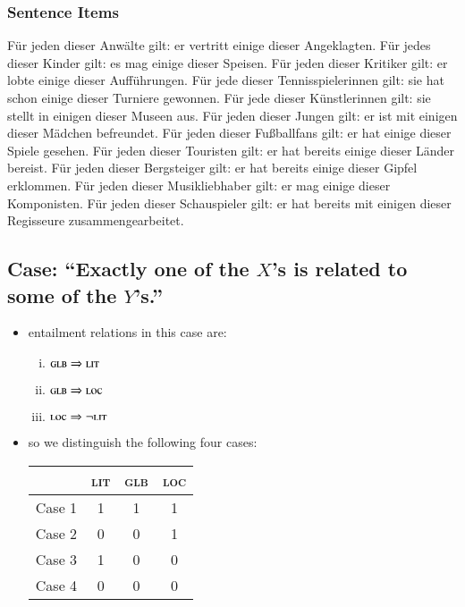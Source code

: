 \documentclass[fleqn,reqno,10pt,draft]{article}
\newcommand{\lit}{\ensuremath{\text{\textsc{lit}}}}
\newcommand{\glb}{\ensuremath{\text{\textsc{glb}}}}
\newcommand{\loc}{\ensuremath{\text{\textsc{loc}}}}
\begin{document}
\subsubsection{Sentence Items}
\label{sec:sentence-items}

\begin{exe}
  \ex
    \begin{xlist}
    \ex Für jeden dieser Anwälte gilt: er vertritt einige dieser
      Angeklagten.
    \ex Für jedes dieser Kinder gilt: es mag einige dieser
      Speisen.
    \ex Für jeden dieser Kritiker gilt: er lobte einige dieser
      Aufführungen.
    \ex Für jede dieser Tennisspielerinnen gilt: sie hat schon
      einige dieser Turniere gewonnen.
    \ex Für jede dieser Künstlerinnen gilt: sie stellt in einigen
      dieser Museen aus.
    \ex Für jeden dieser Jungen gilt: er ist mit einigen dieser
      Mädchen befreundet.
    \ex Für jeden dieser Fußballfans gilt: er hat einige dieser
      Spiele gesehen.
    \ex Für jeden dieser Touristen gilt: er hat bereits einige dieser
      Länder bereist.
    \ex Für jeden dieser Bergsteiger gilt: er hat bereits einige dieser
      Gipfel erklommen.
    \ex Für jeden dieser Musikliebhaber gilt: er mag einige
      dieser Komponisten.
    \ex Für jeden dieser Schauspieler gilt: er hat bereits mit einigen dieser
      Regisseure zusammengearbeitet.
    \end{xlist}
\end{exe}

\subsection{Case: ``Exactly one of the $X$'s is related to some of the
  $Y$'s.''}
\label{sec:case:-exactly1-some}

\begin{itemize}
\item entailment relations in this case are:
  \begin{enumerate}[(i)]
  \item $\glb \Rightarrow \lit$
  \item $\glb \Rightarrow \loc$
  \item $\loc \Rightarrow \neg \lit$
  \end{enumerate}
\item so we distinguish the following four cases:
\begin{center}
    \begin{tabular}{lccc}
      \toprule
      & \textsc{lit} & \textsc{glb} & \textsc{loc} \\ \midrule
      Case 1 & 1 & 1 & 1 \\
      Case 2 & 0 & 0 & 1 \\
      Case 3 & 1 & 0 & 0 \\
      Case 4 & 0 & 0 & 0 \\ \bottomrule
    \end{tabular}
  \end{center}

\end{itemize}
\end{document}
